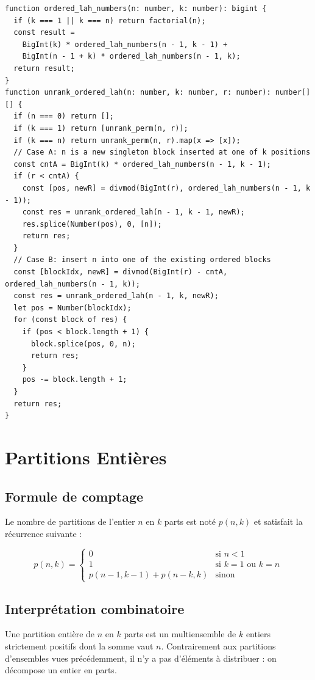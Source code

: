 \documentclass[12pt, a4paper]{report}
\begin{document}
\begin{verbatim}
function ordered_lah_numbers(n: number, k: number): bigint {
  if (k === 1 || k === n) return factorial(n);
  const result =
    BigInt(k) * ordered_lah_numbers(n - 1, k - 1) +
    BigInt(n - 1 + k) * ordered_lah_numbers(n - 1, k);
  return result;
}
function unrank_ordered_lah(n: number, k: number, r: number): number[][] {
  if (n === 0) return [];
  if (k === 1) return [unrank_perm(n, r)];
  if (k === n) return unrank_perm(n, r).map(x => [x]);
  // Case A: n is a new singleton block inserted at one of k positions
  const cntA = BigInt(k) * ordered_lah_numbers(n - 1, k - 1);
  if (r < cntA) {
    const [pos, newR] = divmod(BigInt(r), ordered_lah_numbers(n - 1, k - 1));
    const res = unrank_ordered_lah(n - 1, k - 1, newR);
    res.splice(Number(pos), 0, [n]);
    return res;
  }
  // Case B: insert n into one of the existing ordered blocks
  const [blockIdx, newR] = divmod(BigInt(r) - cntA, ordered_lah_numbers(n - 1, k));
  const res = unrank_ordered_lah(n - 1, k, newR);
  let pos = Number(blockIdx);
  for (const block of res) {
    if (pos < block.length + 1) {
      block.splice(pos, 0, n);
      return res;
    }
    pos -= block.length + 1;
  }
  return res;
}
\end{verbatim}

\section{Partitions Enti\`eres}

\subsection{Formule de comptage}

Le nombre de partitions de l'entier $n$ en $k$ parts est not\'e $p(n, k)$ et
satisfait la r\'ecurrence suivante :

\[
  p(n, k) =
  \begin{cases}
    0 & \text{si } n < 1 \\[6pt]
    1 & \text{si } k = 1 \text{ ou } k = n \\[6pt]
    p(n-1, k-1) + p(n-k, k) & \text{sinon}
  \end{cases}
\]

\subsection{Interpr\'etation combinatoire}

Une partition enti\`ere de $n$ en $k$ parts est un multiensemble de $k$ entiers
strictement positifs dont la somme vaut $n$. Contrairement aux partitions d'ensembles
vues pr\'ec\'edemment, il n'y a pas d'\'el\'ements \`a distribuer : on d\'ecompose
un entier en parts.
\end{document}
